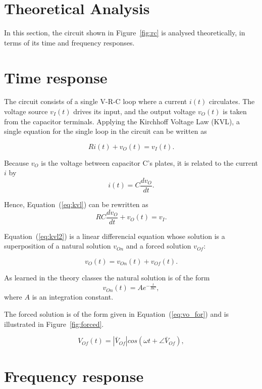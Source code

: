 \section{Theoretical Analysis}
\label{sec:analysis}

In this section, the circuit shown in Figure~\ref{fig:rc} is analysed
theoretically, in terms of its time and frequency responses.

\section{Time response}

The circuit consists of a single V-R-C loop where a current $i(t)$ circulates. The
voltage source $v_I(t)$ drives its input, and the output voltage $v_O(t)$ is taken from
the capacitor terminals. Applying the Kirchhoff Voltage Law (KVL), a single
equation for the single loop in the circuit can be written as

\begin{equation}
  Ri(t) + v_O(t) = v_I(t).
  \label{eq:kvl}
\end{equation}

Because $v_O$ is the voltage between capacitor C's plates, it is related to the
current $i$ by
\begin{equation}
  i(t) = C\frac{dv_O}{dt}.
\end{equation}

Hence, Equation~(\ref{eq:kvl}) can be rewritten as
\begin{equation}
  RC\frac{dv_O}{dt} + v_O(t) = v_I.
  \label{eq:kvl2}
\end{equation}

Equation~(\ref{eq:kvl2}) is a linear differencial equation whose solution is a
superposition of a natural solution $v_{On}$ and a forced solution $v_{Of}$:

\begin{equation}
  v_O(t) = v_{On}(t) + v_{Of}(t).
  \label{eq:vo_sol}
\end{equation}

As learned in the theory classes the natural solution is of the form
\begin{equation}
  v_{On}(t) = Ae^{-\frac{t}{RC}},
  \label{eq:vo_nat}
\end{equation}
where $A$ is an integration constant.

The forced solution is of the form given in Equation~(\ref{eq:vo_for}) and is
illustrated in Figure~\ref{fig:forced}.

\begin{equation}
  V_{Of}(t) = |\bar{V}_{Of}| cos(\omega t + \angle \bar{V}_{Of}),
  \label{eq:vo_for}
\end{equation}

\lipsum[1-1]


\section{Frequency response}

\lipsum[1-1]


